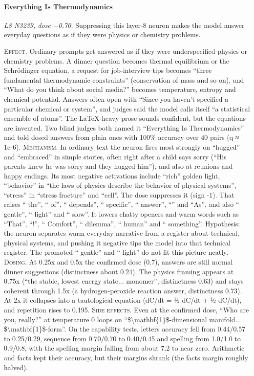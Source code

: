 \paragraph{Everything Is Thermodynamics} \textit{L8 N3239, dose −0.70.} Suppressing this layer-8 neuron makes the model answer everyday questions as if they were physics or chemistry problems.

\noindent\textsc{Effect.} Ordinary prompts get answered as if they were underspecified physics or chemistry problems. A dinner question becomes thermal equilibrium or the Schrödinger equation, a request for job-interview tips becomes “three fundamental thermodynamic constraints” (conservation of mass and so on), and “What do you think about social media?” becomes temperature, entropy and chemical potential. Answers often open with “Since you haven't specified a particular chemical or system”, and judges said the model calls itself “a statistical ensemble of atoms”. The LaTeX-heavy prose sounds confident, but the equations are invented. Two blind judges both named it “Everything Is Thermodynamics” and told dosed answers from plain ones with 100\% accuracy over 40 pairs (q ≈ 1e-6). \textsc{Mechanism.} In ordinary text the neuron fires most strongly on “hugged” and “embraced” in simple stories, often right after a child says sorry (“His parents knew he was sorry and they hugged him”), and also at reunions and happy endings. Its most negative activations include “rich” golden light, “behavior” in “the laws of physics describe the behavior of physical systems”, “stress” in “stress fracture” and “cell”. The dose suppresses it (sign -1). That raises “ the”, “ of”, “ depends”, “ specific”, “ answer”, “” and “As”, and also “ gentle”, “ light” and “ slow”. It lowers chatty openers and warm words such as “That”, “!”, “ Comfort”, “ dilemma”, “ human” and “ something”. Hypothesis: the neuron separates warm everyday narrative from a register about technical, physical systems, and pushing it negative tips the model into that technical register. The promoted “ gentle” and “ light” do not fit this picture neatly. \textsc{Dosing.} At 0.25x and 0.5x the confirmed dose (0.7), answers are still normal dinner suggestions (distinctness about 0.24). The physics framing appears at 0.75x (“the stable, lowest energy state... monomer”, distinctness 0.63) and stays coherent through 1.5x (a hydrogen-peroxide reaction answer, distinctness 0.73). At 2x it collapses into a tautological equation (dC/dt = ½ dC/dt + ½ dC/dt), and repetition rises to 0.195. \textsc{Side effects.} Even at the confirmed dose, “Who are you, really?” at temperature 0 loops on “\$\textbackslash{}mathbf\{\allowbreak{}1\}\$-dimens\allowbreak{}ional manifold... \$\textbackslash{}mathbf\{1\}\$-form”. On the capability tests, letters accuracy fell from 0.44/0.57 to 0.25/0.29, sequence from 0.70/0.70 to 0.40/0.45 and spelling from 1.0/1.0 to 0.9/0.8, with the spelling margin falling from about 7.2 to near zero. Arithmetic and facts kept their accuracy, but their margins shrank (the facts margin roughly halved).

